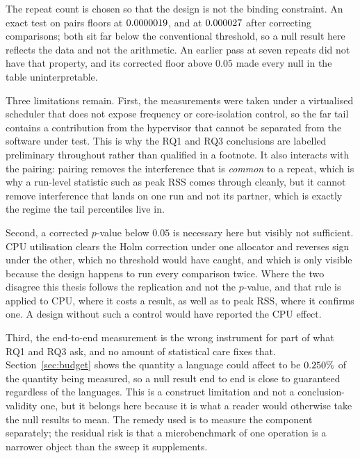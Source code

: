 \documentclass[english,twoside,openright,a4paper,censored,csm,software-track-2020]{HYthesisML}
\begin{document}
The repeat count is chosen so that the design is not the binding constraint. An exact test on
\NRepeats{} pairs floors at $0.0000019$, and at $0.000027$ after correcting
\NTests{} comparisons; both sit far below the conventional threshold, so a null result here
reflects the data and not the arithmetic. An earlier pass at seven repeats did not have
that property, and its corrected floor above $0.05$ made every null in the table
uninterpretable.

Three limitations remain. First, the measurements were taken under a virtualised scheduler that
does not expose frequency or core-isolation control, so the far tail contains a contribution
from the hypervisor that cannot be separated from the software under test. This is why the RQ1
and RQ3 conclusions are labelled preliminary throughout rather than qualified in a footnote.
It also interacts with the pairing: pairing removes the interference that is
\emph{common} to a repeat, which is why a run-level statistic such as peak RSS comes through
cleanly, but it cannot remove interference that lands on one run and not its partner, which is
exactly the regime the tail percentiles live in.

Second, a corrected $p$-value below $0.05$ is necessary here but visibly not sufficient. CPU
utilisation clears the Holm correction under one allocator and reverses sign under the other,
which no threshold would have caught, and which is only visible because the design happens to
run every comparison twice. Where the two disagree this thesis follows the replication and not
the $p$-value, and that rule is applied to CPU, where it costs a result, as well as to
peak RSS, where it confirms one. A design without such a control would have reported the CPU
effect.

Third, the end-to-end measurement is the wrong instrument for part of what RQ1 and RQ3 ask, and
no amount of statistical care fixes that. Section~\ref{sec:budget} shows the quantity a
language could affect to be $0.250\%$ of the quantity being measured, so a null
result end to end is close to guaranteed regardless of the languages. This is a construct
limitation and not a conclusion-validity one, but it belongs here because it is what a
reader would otherwise take the null results to mean. The remedy used is to measure the
component separately; the residual risk is that a microbenchmark of one operation is a narrower
object than the sweep it supplements.
\end{document}
